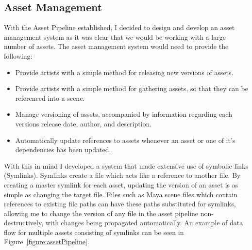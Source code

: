 \documentclass[11pt]{article}
\begin{document}
\subsection{Asset Management} \label{assman}

With the Asset Pipeline established, I decided to design and develop an asset management system as it was clear that we would be working with a large number of assets. The asset management system would need to provide the following:

\begin{itemize}

\item Provide artists with a simple method for releasing new versions of assets.

\item Provide artists with a simple method for gathering assets, so that they can be referenced into a scene.

\item Manage versioning of assets, accompanied by information regarding each versions release date, author, and  description.

\item Automatically update references to assets whenever an asset or one of it's dependencies has been updated.

\end{itemize}

With this in mind I developed a system that made extensive use of symbolic links (Symlinks). Symlinks create a file which acts like a reference to another file. By creating a master symlink for each asset, updating the version of an asset is as simple as changing the target file. Files such as Maya scene files which contain references to existing file paths can have these paths substituted for symlinks, allowing me to change the version of any file in the asset pipeline non-destructively, with changes being propagated automatically. An example of data flow for multiple assets consisting of symlinks can be seen in Figure~\ref{figure:assetPipeline}.
\end{document}
